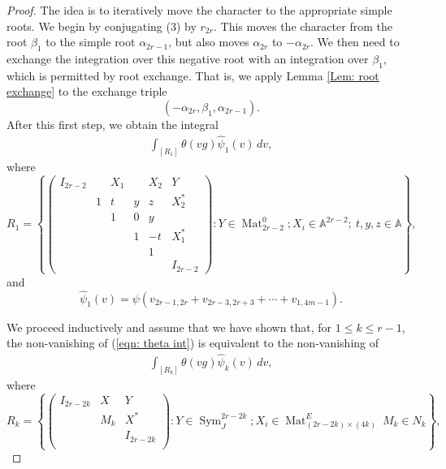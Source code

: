 \documentclass[11pt,reqno]{amsart}
\theoremstyle{definition}
\theoremstyle{remark}
\theoremstyle{definition}
\begin{document}
\begin{proof}
The idea is to iteratively move the character to the appropriate simple roots. We begin by conjugating (3) by $r_{2r}$. 
This moves the character from the root ${\beta}_1$ to the simple root ${\alpha}_{2r-1}$, but also moves ${\alpha}_{2r}$ to $-{\alpha}_{2r}$. We then need to exchange the integration over this negative root with an integration over ${\beta}_1$, which is permitted by root exchange. That is, we apply Lemma \ref{Lem: root exchange} to the exchange triple $$(-{\alpha}_{2r}, {\beta}_1, {\alpha}_{2r-1}).$$ After this first step, we obtain the integral
\begin{align}\label{eqn: base non-vanishing}
\displaystyle \int_{[R_{1}]} \theta(vg) \hat{\psi}_{1}(v)\,dv,
\end{align}
where 
\[
R_{1} = \left\{ \left( \begin{array}{cccccc}
									I_{2r-2}&&X_1&&X_2&Y\\
									&1&t&y&z&X_2^*\\
									&&1&0&y&\\
									&&&1&-t&X_1^*\\
									&&&&1&\\
									&&&&&I_{2r-2}
\end{array}\right): Y\in \operatorname{Mat}_{2r-2}^0; X_i\in {\mathbb A}^{2r-2};\:t,y,z\in {\mathbb A}\right\},
\]
and 
\[
 \hat{\psi}_{1}(v)= \psi( v_{2r-1,2r} + v_{2r-3,2r+3}+\cdots + v_{1,4m-1}).
\]

We proceed inductively and assume that we have shown that, for $1\leq k\leq r-1$, the non-vanishing of (\ref{eqn: theta int}) is equivalent to the non-vanishing of 
\begin{align}
\displaystyle \int_{[R_{k}]} \theta(vg) \hat{\psi}_{k}(v)\,dv,
\end{align}\label{eqn: induction vanish}
where 
\[
R_{k} = \left\{ \left( \begin{array}{ccc}
									I_{2r-2k}&X&Y\\
									&M_k&X^*\\
									&&I_{2r-2k}\\
									
\end{array}\right): Y\in \operatorname{Sym}_J^{2r-2k}; X_i\in \operatorname{Mat}^E_{(2r-2k)\times(4k)} \: M_k \in N_k\right\},
\]
 

\end{proof}
\end{document}
